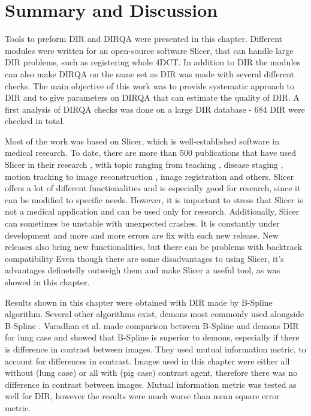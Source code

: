 \documentclass[type=dr, dr=rernat, accentcolor=tud7b,colorbacktitle, bigchapter, openright, twoside, 12pt ]{tudthesis}
\begin{document}


\section{Summary and Discussion}
\label{Summary}

Tools to preform DIR and DIRQA were presented in this chapter. Different modules were written for an open-source software Slicer, that can handle large DIR problems, such as registering whole 4DCT. In addition to DIR the modules can also make DIRQA on the same set as DIR was made with several different
checks. The main objective of this work was to provide systematic approach to DIR and to give parameters on DIRQA that can estimate the quality of DIR. A first analysis of DIRQA checks was done on a large DIR database - 684 DIR were checked in total.

Most of the work was based on Slicer, which is well-established software in medical research. To date, there are more than 500 publications that have used Slicer in their research \cite{SlicerCitation}, with topic ranging from 
teaching \cite{Pujol2016}, disease staging \cite{Liu2016, Liu2015}, motion tracking \cite{Behringer2015} to image reconstruction \cite{Meyer2015}, image registration \cite{Li2015, Fedorov2015, Li2015b}
and others. Slicer offers a lot of different functionalities and is especially good for research, since it can be modified to specific needs. However, it is important to stress that Slicer 
is not a medical application and can be used only for research. Additionally, Slicer can sometimes be unstable with unexpected crashes. It is constantly under development and more and more errors
are fix with each new release. New releases also bring new functionalities, but there can be problems with backtrack compatibility Even though there are some disadvantages to using Slicer, it's advantages
definetelly outweigh them and make Slicer a useful tool, as was showed in this chapter.

Results shown in this chapter were obtained with DIR made by B-Spline algorithm. Several other algorithms exist, demons most commonly used alongside B-Spline \cite{Thirion1998}. Varadhan et al. made comparison
between B-Spline and demons DIR for lung case \cite{Varadhan2013} and showed that B-Spline is superior to demons, especially if there is difference in contrast between images. They used mutual information
metric, to account for differences in contrast. Images used in this chapter were either all without (lung case) or all with (pig case) contrast agent, therefore there was no difference in contrast
between images. Mutual information metric was tested as well for DIR, however the results were much worse than mean square error metric.
\end{document}
